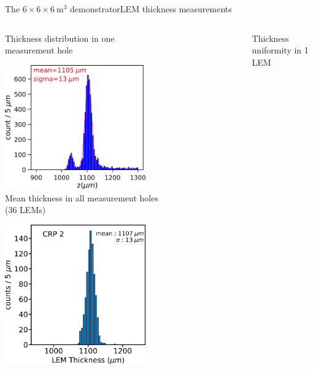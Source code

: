 \documentclass[10pt]{beamer}
\begin{document}
    \begin{frame}{The \texorpdfstring{$6 \times 6 \times \SI{6}{\meter\cubed}$}{666} demonstrator}{LEM thickness measurements}
    	\begin{scriptsize}
    		\begin{columns}
    			\begin{column}{0.48\textwidth}
    				\centering
    				Thickness distribution in one \\measurement hole\\\vspace{0.1cm}
    				
    				\includegraphics[width=0.6\textwidth]{figures/666/distri_1_trou_lem.png}\\
    				\vspace{0.3cm}
    				\centering
    				Mean thickness in all measurement holes \\(36 LEMs)\\\vspace{0.1cm}
    				
    				\includegraphics[width=0.6\textwidth]{figures/666/LEM_sum_all_histo_CERN.png}
    			\end{column}
    			\hfill
    			\begin{column}{0.48\textwidth}
    				\centering
    				Thickness uniformity in 1 LEM\\\vspace{0.1cm}
    				

\end{column}
\end{columns}
\end{scriptsize}
\end{frame}
\end{document}
